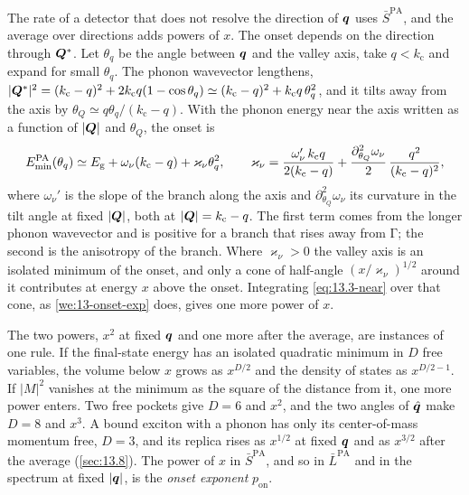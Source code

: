 The rate of a detector that does not resolve the direction of $\bm{q}$ uses $\bar S^{\mathrm{PA}}$, and the average over directions adds powers of $x$. The onset depends on the direction through $\bm{Q}^*$. Let $\theta_q$ be the angle between $\bm{q}$ and the valley axis, take $q < k_{\mathrm{c}}$ and expand for small $\theta_q$. The phonon wavevector lengthens, $|\bm{Q}^*|^2 = (k_{\mathrm{c}} - q)^2 + 2k_{\mathrm{c}}q(1 - \cos\theta_q) \simeq (k_{\mathrm{c}} - q)^2 + k_{\mathrm{c}}q\,\theta_q^2$, and it tilts away from the axis by $\theta_Q \simeq q\theta_q/(k_{\mathrm{c}} - q)$. With the phonon energy near the axis written as a function of $|\bm{Q}|$ and $\theta_Q$, the onset is
\begin{equation}
  E_{\mathrm{min}}^{\mathrm{PA}}(\theta_q) \simeq E_{\mathrm{g}} + \omega_\nu(k_{\mathrm{c}} - q) + \varkappa_\nu\theta_q^2 , \qquad
  \varkappa_\nu = \frac{\omega_\nu'\,k_{\mathrm{c}}q}{2(k_{\mathrm{c}} - q)} + \frac{\partial^2_{\theta_Q}\omega_\nu}{2}\,\frac{q^2}{(k_{\mathrm{c}} - q)^2} ,
  \label{eq:13.3-Eth}
\end{equation}
where $\omega_\nu'$ is the slope of the branch along the axis and $\partial^2_{\theta_Q}\omega_\nu$ its curvature in the tilt angle at fixed $|\bm{Q}|$, both at $|\bm{Q}| = k_{\mathrm{c}} - q$. The first term comes from the longer phonon wavevector and is positive for a branch that rises away from $\mathrm{\Gamma}$; the second is the anisotropy of the branch. Where $\varkappa_\nu > 0$ the valley axis is an isolated minimum of the onset, and only a cone of half-angle $(x/\varkappa_\nu)^{1/2}$ around it contributes at energy $x$ above the onset. Integrating \cref{eq:13.3-near} over that cone, as \cref{we:13-onset-exp} does, gives one more power of $x$.

The two powers, $x^2$ at fixed $\bm{q}$ and one more after the average, are instances of one rule. If the final-state energy has an isolated quadratic minimum in $D$ free variables, the volume below $x$ grows as $x^{D/2}$ and the density of states as $x^{D/2 - 1}$. If $|M|^2$ vanishes at the minimum as the square of the distance from it, one more power enters. Two free pockets give $D = 6$ and $x^2$, and the two angles of $\hat{\bm{q}}$ make $D = 8$ and $x^3$. A bound exciton with a phonon has only its center-of-mass momentum free, $D = 3$, and its replica rises as $x^{1/2}$ at fixed $\bm{q}$ and as $x^{3/2}$ after the average (\cref{sec:13.8}). The power of $x$ in $\bar S^{\mathrm{PA}}$, and so in $\bar L^{\mathrm{PA}}$ and in the spectrum at fixed $|\bm{q}|$, is the \emph{onset exponent} $p_{\mathrm{on}}$.

